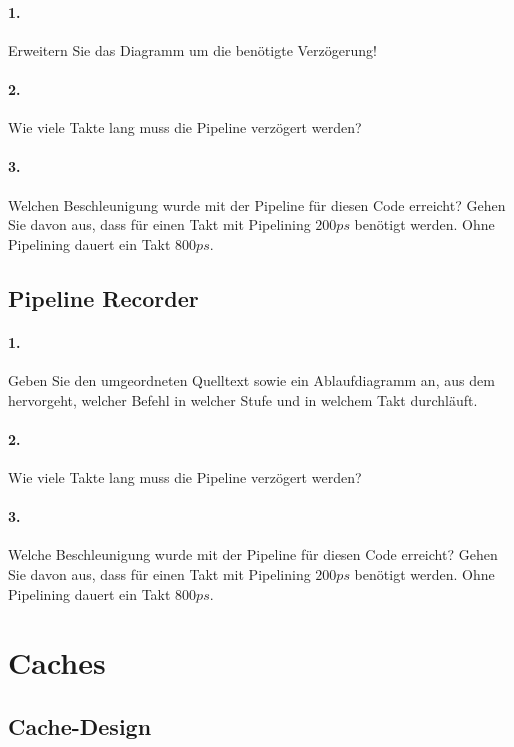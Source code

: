 \documentclass[paper=a4, fontsize=11pt]{scrartcl}
\numberwithin{equation}{section}
\numberwithin{figure}{section}
\numberwithin{table}{section}
\begin{document}
\paragraph{1.}
Erweitern Sie das Diagramm um die benötigte Verzögerung!

\paragraph{2.}
Wie viele Takte lang muss die Pipeline verzögert werden?

\paragraph{3.}
Welchen Beschleunigung wurde mit der Pipeline für diesen Code erreicht? Gehen Sie davon aus, dass für einen Takt mit Pipelining $200 ps$ benötigt werden. Ohne Pipelining dauert ein Takt $800 ps$.

\subsection{Pipeline Recorder}

\paragraph{1.}
Geben Sie den umgeordneten Quelltext sowie ein Ablaufdiagramm an, aus dem hervorgeht, welcher Befehl in welcher Stufe und in welchem Takt durchläuft.

\paragraph{2.}
Wie viele Takte lang muss die Pipeline verzögert werden?

\paragraph{3.}
Welche Beschleunigung wurde mit der Pipeline für diesen Code erreicht? Gehen Sie davon aus, dass für einen Takt mit Pipelining $200 ps$ benötigt werden. Ohne Pipelining dauert ein Takt $800 ps$.

\section{Caches}
\subsection{Cache-Design}
\end{document}
